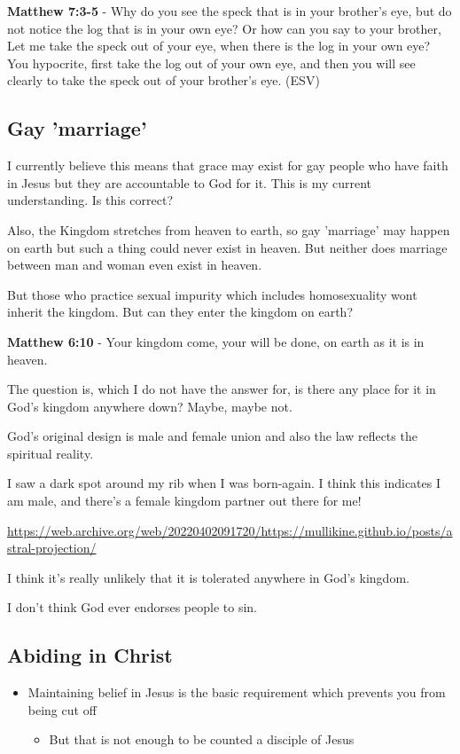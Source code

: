 \documentclass[11pt]{article}
\begin{document}
\textbf{Matthew 7:3-5} - Why do you see the speck that is in your brother's eye, but do not notice the log that is in your own eye? Or how can you say to your brother, Let me take the speck out of your eye, when there is the log in your own eye? You hypocrite, first take the log out of your own eye, and then you will see clearly to take the speck out of your brother's eye. (ESV)

\subsection{Gay 'marriage'}
\label{sec:org8fea037}
I currently believe this means that grace may exist for gay people who have faith in Jesus but they are accountable to God for it.
This is my current understanding. Is this correct?

Also, the Kingdom stretches from heaven to earth, so gay 'marriage' may happen on earth but such a thing could never exist in heaven.
But neither does marriage between man and woman even exist in heaven.

But those who practice sexual impurity which includes homosexuality wont inherit the kingdom. But can they enter the kingdom on earth?

\textbf{Matthew 6:10} - Your kingdom come, your will be done, on earth as it is in heaven.

The question is, which I do not have the answer for, is there any place for it in God's kingdom anywhere down? Maybe, maybe not.

God's original design is male and female union and also the law reflects the spiritual reality.

I saw a dark spot around my rib when I was born-again.
I think this indicates I am male, and there's a female kingdom partner out there for me!

\url{https://web.archive.org/web/20220402091720/https://mullikine.github.io/posts/astral-projection/}

I think it's really unlikely that it is tolerated anywhere in God's kingdom.

I don't think God ever endorses people to sin.

\subsection{Abiding in Christ}
\label{sec:org40f421a}
\begin{itemize}
\item Maintaining belief in Jesus is the basic requirement which prevents you from being cut off
\begin{itemize}
\item But that is not enough to be counted a disciple of Jesus
\end{itemize}
\end{itemize}
\end{document}
